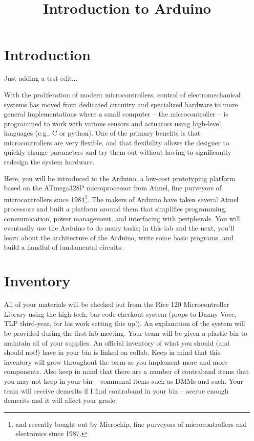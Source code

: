 \documentclass[11pt]{article} %
\title{Introduction to Arduino}
\author{}
\date{} %
\begin{document}
\maketitle


\section*{Introduction}

Just adding a test edit...


With the proliferation of modern microcontrollers, control of electromechanical systems has moved from dedicated circuitry and specialized hardware to more general implementations where a small computer -- the microcontroller -- is programmed to work with various sensors and actuators using high-level languages (e.g., C or python). One of the primary benefits is that microcontrollers are very flexible, and that flexibility allows the designer to quickly change parameters and try them out without having to significantly redesign the system hardware.

Here, you will be introduced to the Arduino, a low-cost prototyping platform based on the ATmega328P microprocessor from Atmel, fine purveyors of microcontrollers since 1984\footnote{and recently bought out by Microchip, fine purveyors of microcontrollers and electronics since 1987.}. The makers of Arduino have taken several Atmel processors and built a platform around them that simplifies programming, communication, power management, and interfacing with peripherals. You will eventually use the Arduino to do many tasks; in this lab and the next, you’ll learn about the architecture of the Arduino, write some basic programs, and build a handful of fundamental circuits.

\section*{Inventory}
\label{sec:inventory}

All of your materials will be checked out from the Rice 120 Microcontroller Library using the high-tech, bar-code checkout system (props to Danny Voce, TLP third-year, for his work setting this up!). An explanation of the system will be provided during the first lab meeting. Your team will be given a plastic bin to maintain all of your supplies. An official inventory of what you should (and should not!) have in your bin is linked on collab. Keep in mind that this inventory will grow throughout the term as you implement more and more components. Also keep in mind that there are a number of contraband items that you may not keep in your bin -- communal items such as DMMs and such. Your team will receive demerits if I find contraband in your bin -- accrue enough demerits and it will affect your grade.
\end{document}
